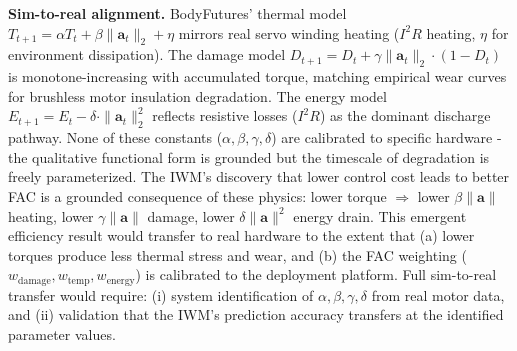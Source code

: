 \documentclass{article}
\begin{document}
{\textbf{Sim-to-real alignment.}
BodyFutures' thermal model $T_{t+1} = \alpha T_t + \beta\|\mathbf{a}_t\|_2 + \eta$ mirrors real servo winding heating ($I^2R$ heating, $\eta$ for environment dissipation). The damage model $D_{t+1} = D_t + \gamma\|\mathbf{a}_t\|_2 \cdot (1 - D_t)$ is monotone-increasing with accumulated torque, matching empirical wear curves for brushless motor insulation degradation. The energy model $E_{t+1} = E_t - \delta\cdot\|\mathbf{a}_t\|_2^2$ reflects resistive losses ($I^2R$) as the dominant discharge pathway. None of these constants ($\alpha,\beta,\gamma,\delta$) are calibrated to specific hardware - the qualitative functional form is grounded but the timescale of degradation is freely parameterized. The IWM's discovery that lower control cost leads to better FAC is a grounded consequence of these physics: lower torque $\Rightarrow$ lower $\beta\|\mathbf{a}\|$ heating, lower $\gamma\|\mathbf{a}\|$ damage, lower $\delta\|\mathbf{a}\|^2$ energy drain. This emergent efficiency result would transfer to real hardware to the extent that (a) lower torques produce less thermal stress and wear, and (b) the FAC weighting ($w_\mathrm{damage}, w_\mathrm{temp}, w_\mathrm{energy}$) is calibrated to the deployment platform. Full sim-to-real transfer would require: (i) system identification of $\alpha,\beta,\gamma,\delta$ from real motor data, and (ii) validation that the IWM's prediction accuracy transfers at the identified parameter values.

}
\end{document}
